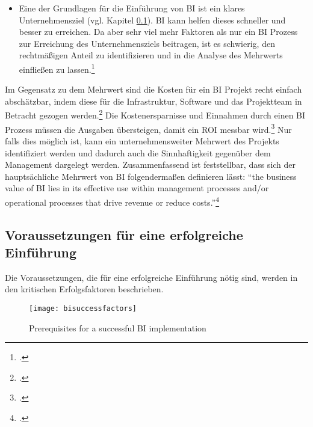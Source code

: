 \begin{itemize}
    abschätzbarer Punkt, da im Vorhinein nicht absehbar ist, inwieweit Prozessoptimierungen nötig sind und wie sich diese
    finanziell auswirken.\footcite[Cf.][p. 2]{williams2003business}
    \item Eine der Grundlagen für die Einführung von \ac{BI} ist ein klares Unternehmensziel (vgl. Kapitel \ref{toc:einfuehrungsstrategien}).
    \ac{BI} kann helfen dieses schneller und besser zu erreichen. Da aber sehr viel mehr Faktoren als nur ein BI Prozess
    zur Erreichung des Unternehmensziels beitragen, ist es schwierig, den rechtmäßigen Anteil zu identifizieren und in die
    Analyse des Mehrwerts einfließen zu lassen.\footcite[Cf.][p. 51]{horakova2013business}
\end{itemize}

Im Gegensatz zu dem Mehrwert sind die Kosten für ein \ac{BI} Projekt recht einfach abschätzbar, indem diese für die Infrastruktur,
Software und das Projektteam in Betracht gezogen werden.\footcite[Cf.][p. 98]{hovcevar2010assessing} Die Kostenersparnisse
und Einnahmen durch einen \ac{BI} Prozess müssen die Ausgaben übersteigen, damit ein \ac{ROI} messbar
wird.\footcite[Cf.][p. 8]{williams2003business} Nur falls dies möglich ist, kann ein unternehmensweiter Mehrwert des Projekts
identifiziert werden und dadurch auch die Sinnhaftigkeit gegenüber dem Management dargelegt werden. Zusammenfassend ist
feststellbar, dass sich der hauptsächliche Mehrwert von BI folgendermaßen definieren lässt: "`the business value of BI lies in
its effective use within management processes and/or operational processes that drive revenue or reduce
costs."'\footcite[][p. 7]{williams2003business}

\subsection{Voraussetzungen für eine erfolgreiche Einführung} \label{toc:einfuehrungsstrategien}

Die Voraussetzungen, die für eine erfolgreiche Einführung nötig sind, werden in den kritischen Erfolgsfaktoren beschrieben.

\begin{figure}[H]
    \caption{Prerequisites for a successful BI implementation}
    \texttt{[image: bisuccessfactors]}
    \label{figure:bisuccessfactors}
    \\
    \cite[Source: Based on][Fig. 1]{yeoh2010critical}
\end{figure}


